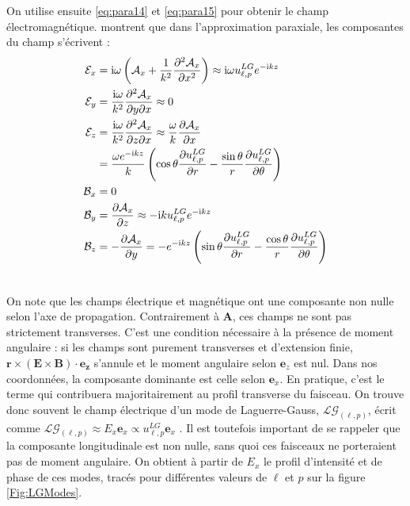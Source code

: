 On utilise ensuite \ref{eq:para14} et \ref{eq:para15} pour obtenir le champ électromagnétique.  montrent que dans l'approximation paraxiale, les composantes du champ s'écrivent :
\begin{align}
\mathcal{E}_x &= \mathrm{i} \omega
\left(\mathcal{A}_x+\frac{1}{k^2}\frac{\partial^2 \mathcal{A}_x}{\partial x^2}\right)\approx \mathrm{i}\omega u^{LG}_{\ell,p}e^{-\mathrm{i} k z} \nonumber\\
\mathcal{E}_y &= \frac{\mathrm{i} \omega}{k^2}
\frac{\partial^2 \mathcal{A}_x}{\partial y \partial x}\approx 0 \nonumber\\
\mathcal{E}_z &= \frac{\mathrm{i} \omega}{k^2}
\frac{\partial^2 \mathcal{A}_x}{\partial z \partial x}\approx 
\frac{\omega}{k}\frac{\partial \mathcal{A}_x}{\partial x}\nonumber\\
&= \frac{\omega e^{-\mathrm{i} k z}}{k}\left(\cos{\theta}\frac{\partial u^{LG}_{\ell,p}}{\partial r}-\frac{\sin \theta}{r} \frac{\partial u^{LG}_{\ell,p}}{\partial \theta}\right)\nonumber\\
\mathcal{B}_x &= 0 \nonumber\\
\mathcal{B}_y &= \frac{\partial \mathcal{A}_x}{\partial z} \approx -\mathrm{i} k u^{LG}_{\ell,p} e^{-\mathrm{i} k z}\nonumber\\
\mathcal{B}_z &= -\frac{\partial \mathcal{A}_x}{\partial y}
=-e^{-\mathrm{i} k z}\left(\sin{\theta}\frac{\partial u^{LG}_{\ell,p}}{\partial r}-\frac{\cos \theta}{r} \frac{\partial u^{LG}_{\ell,p}}{\partial \theta}\right)\\ \nonumber
\end{align}

On note que les champs électrique et magnétique ont une composante non nulle selon l'axe de propagation. Contrairement à $\bm{A}$, ces champs ne sont pas strictement transverses. C'est une condition nécessaire à la présence de moment angulaire : si les champs sont purement transverses et d'extension finie, $\bm{r}\times(\bm{E}\times\bm{B})\cdot\bm{e_z}$ s'annule et le moment angulaire selon $\bm{e}_z$ est nul. Dans nos coordonnées, la composante dominante est celle selon $\bm{e}_x$. En pratique, c'est le terme qui contribuera majoritairement au profil transverse du faisceau. On trouve donc souvent le champ électrique d'un mode de Laguerre-Gauss, $\mathcal{LG}_{(\ell,p)}$, écrit comme $\mathcal{LG}_{(\ell,p)} \approx E_x \bm{e}_x \propto u^{LG}_{\ell,p} \bm{e}_x$ . Il est toutefois important de se rappeler que la composante longitudinale est non nulle, sans quoi ces faisceaux ne porteraient pas de moment angulaire. On obtient à partir de $E_x$ le profil d'intensité et de phase de ces modes,  tracés pour différentes valeurs de $\ell$ et $p$ sur la figure \ref{Fig:LGModes}.

